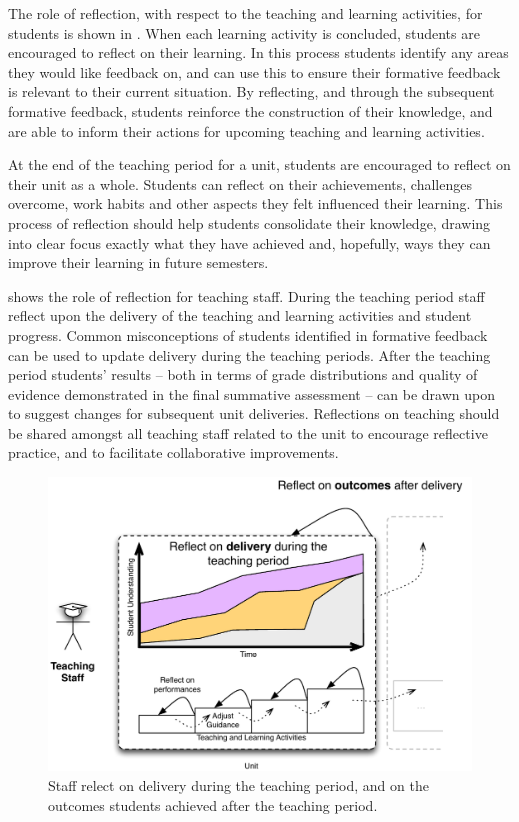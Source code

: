 The role of reflection, with respect to the teaching and learning activities, for students is shown in . When each learning activity is concluded, students are encouraged to reflect on their learning. In this process students identify any areas they would like feedback on, and can use this to ensure their formative feedback is relevant to their current situation. By reflecting, and through the subsequent formative feedback, students reinforce the construction of their knowledge, and are able to inform their actions for upcoming teaching and learning activities.

At the end of the teaching period for a unit, students are encouraged to reflect on their unit as a whole. Students can reflect on their achievements, challenges overcome, work habits and other aspects they felt influenced their learning. This process of reflection should help students consolidate their knowledge, drawing into clear focus exactly what they have achieved and, hopefully, ways they can improve their learning in future semesters.

 shows the role of reflection for teaching staff. During the teaching period staff reflect upon the delivery of the teaching and learning activities and student progress. Common misconceptions of students identified in formative feedback can be used to update delivery during the teaching periods. After the teaching period students' results -- both in terms of grade distributions and quality of evidence demonstrated in the final summative assessment -- can be drawn upon to suggest changes for subsequent unit deliveries. Reflections on teaching should be shared amongst all teaching staff related to the unit to encourage reflective practice, and to facilitate collaborative improvements.

\begin{figure}[ptbh]
	\centering
	\includegraphics[width=\textwidth]{StaffReflection}
	\caption{Staff relect on delivery during the teaching period, and on the outcomes students achieved after the teaching period.}
	\label{fig:staff_reflection}
\end{figure} 

